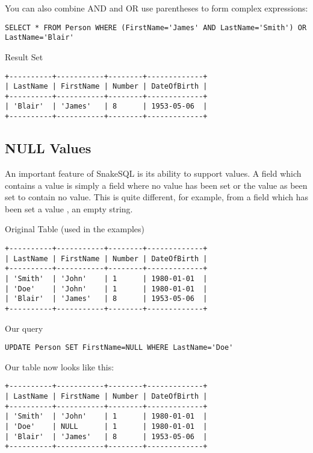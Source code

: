 \documentclass{howto}
\begin{document}

You can also combine AND and OR use parentheses to form complex expressions:


\begin{verbatim}
SELECT * FROM Person WHERE (FirstName='James' AND LastName='Smith') OR LastName='Blair'
\end{verbatim}

Result Set
\begin{verbatim}
+----------+-----------+--------+-------------+
| LastName | FirstName | Number | DateOfBirth |
+----------+-----------+--------+-------------+
| 'Blair'  | 'James'   | 8      | 1953-05-06  |
+----------+-----------+--------+-------------+
\end{verbatim}

\subsection{NULL Values}

An important feature of SnakeSQL is its ability to support  values. A field which contains a  value is simply a field where no value has been set or the value as been set to contain no value. This is quite different, for example, from a  field which has been set a value , an empty string.

Original Table (used in the examples)
\begin{verbatim}
+----------+-----------+--------+-------------+
| LastName | FirstName | Number | DateOfBirth |
+----------+-----------+--------+-------------+
| 'Smith'  | 'John'    | 1      | 1980-01-01  |
| 'Doe'    | 'John'    | 1      | 1980-01-01  |
| 'Blair'  | 'James'   | 8      | 1953-05-06  |
+----------+-----------+--------+-------------+
\end{verbatim}

Our query
\begin{verbatim}
UPDATE Person SET FirstName=NULL WHERE LastName='Doe'
\end{verbatim}

Our table now looks like this:
\begin{verbatim}
+----------+-----------+--------+-------------+
| LastName | FirstName | Number | DateOfBirth |
+----------+-----------+--------+-------------+
| 'Smith'  | 'John'    | 1      | 1980-01-01  |
| 'Doe'    | NULL      | 1      | 1980-01-01  |
| 'Blair'  | 'James'   | 8      | 1953-05-06  |
+----------+-----------+--------+-------------+
\end{verbatim}
\end{document}
